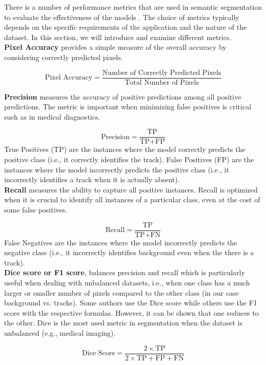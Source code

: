 \documentclass[Master,MDS,english]{BASE/twbook} %
\begin{document}
There is a number of performance metrics that are used in semantic segmentation to evaluate the effectiveness of the models \citep{Taha2015}. The choice of metrics typically depends on the specific requirements of the application and the nature of the dataset. In this section, we will introduce and examine different metrics. \\


\noindent\textbf{Pixel Accuracy} provides a simple measure of the overall accuracy by considering correctly predicted pixels. 


\[
\text{Pixel Accuracy} = \frac{\text{Number of Correctly Predicted Pixels}}{\text{Total Number of Pixels}}
\]

\noindent\textbf{Precision} measures the accuracy of positive predictions among all positive predictions. The metric is important when minimizing false positives is critical such as in medical diagnostics.

\[
\text{Precision} = \frac{\text{TP}}{\text{TP} + \text{FP}}
\]
True Positives (TP) are the instances where the model correctly predicts the positive class (i.e., it correctly identifies the track).
False Positives (FP) are the instances where the model incorrectly predicts the positive class (i.e., it incorrectly identifies a track when it is actually absent). \\


\noindent\textbf{Recall} measures the ability to capture all positive instances. Recall is optimized when it is crucial to identify all instances of a particular class, even at the cost of some false positives.

\[
\text{Recall} = \frac{\text{TP}}{\text{TP} + \text{FN}}
\]
False Negatives are the instances where the model incorrectly predicts the negative class (i.e., it incorrectly identifies background even when the there is a track). \\

\noindent\textbf{Dice score or F1 score}, balances precision and recall which is particularly useful when dealing with unbalanced datasets, i.e., when one class has a much larger or smaller number of pixels compared to the other class (in our case background vs. tracks). Some authors use the Dice score while others use the F1 score with the respective formulas. However, it can be shown that one reduces to the other. Dice is the most used metric in segmentation when the dataset is unbalanced (e.g., medical imaging). 


\[
\text{Dice Score} = \frac{2 \times \text{TP}}{2 \times \text{TP} + \text{FP} + \text{FN}}
\]
\end{document}
